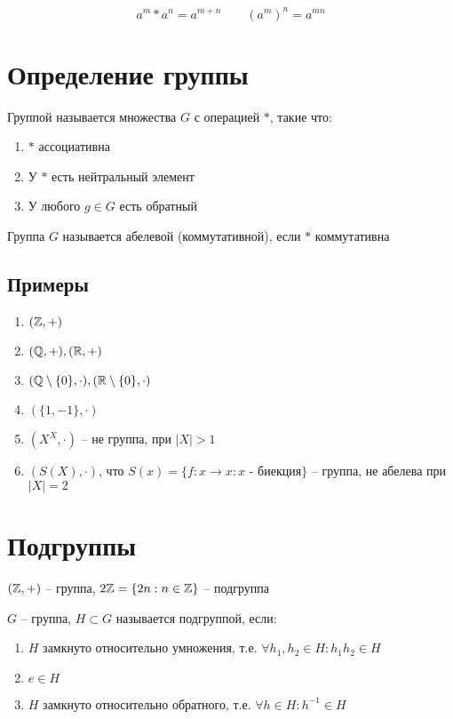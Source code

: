 \documentclass[main]{subfiles}
\begin{document}
\[a^m * a^n = a^{m+n} \qquad (a^m)^n = a^ {mn}\]

\section{Определение группы}

\begin{definition}
    Группой называется множества $G$ с операцией $*$, такие что:
    \begin{enumerate}
        \item $*$ ассоциативна
        \item У $*$ есть нейтральный элемент
        \item У любого $g\in G$ есть обратный
    \end{enumerate}
    Группа $G$ называется абелевой (коммутативной), если $*$ коммутативна
\end{definition}

\subsection{Примеры}
\begin{enumerate}
    \item $(\mathbb{Z}, +)$
    \item $(\mathbb{Q}, +), (\mathbb{R}, +)$
    \item $(\mathbb{Q} \setminus \{0\}, \cdot), (\mathbb{R} \setminus \{0\}, \cdot)$
    \item $(\{1, -1\}, \cdot)$
    \item $(X^X, \cdot)$ -- не группа, при $|X| > 1$
    \item $(S(X), \cdot)$, что
          $S(x)=\{f:x\to x : x \text{ - биекция}\}$ -- группа,
          не абелева при $|X| = 2$
\end{enumerate}

\section{Подгруппы}

\begin{case}
    $(\mathbb{Z}, +)$ -- группа, $2\mathbb{Z} = \{2n: n \in \mathbb{Z}\}$ -- подгруппа
\end{case}

\begin{definition}
    $G$ -- группа, $H \subset G$ называется подгруппой, если:
    \begin{enumerate}
        \item $H$ замкнуто относительно умножения, т.е. $\forall h_1, h_2 \in H: h_1 h_2 \in H$
        \item $e \in H$
        \item $H$ замкнуто относительно обратного, т.е. $\forall h \in H: h^{-1} \in H$
    \end{enumerate}
\end{definition}
\end{document}
